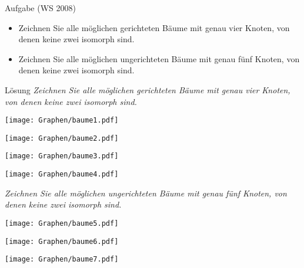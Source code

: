 \begin{frame}{Aufgabe (WS 2008) }
	\begin{itemize}	
		\item Zeichnen Sie alle möglichen gerichteten Bäume mit genau vier Knoten, von denen keine zwei isomorph sind.
		\item Zeichnen Sie alle möglichen ungerichteten Bäume mit genau fünf Knoten, von denen keine zwei isomorph sind.
	\end{itemize}
\end{frame}

\begin{frame}{Lösung}
	\textit{Zeichnen Sie alle möglichen gerichteten Bäume mit genau vier Knoten, von denen keine zwei isomorph sind.} \pause
	\begin{center}
		\begin{minipage}{0.3\linewidth}
			\vspace*{\fill}
			\centering
			\texttt{[image: Graphen/baume1.pdf]} 
			\vfill
		\end{minipage}
		\begin{minipage}{0.2\linewidth}
			\vspace*{\fill}
			\centering
			\texttt{[image: Graphen/baume2.pdf]} 
			\vfill
		\end{minipage}
		\begin{minipage}{0.2\linewidth}
			\vspace*{\fill}
			\centering
			\texttt{[image: Graphen/baume3.pdf]} 
			\vfill
		\end{minipage}
		\begin{minipage}{0.2\linewidth}
			\vspace*{\fill}
			\centering
			\texttt{[image: Graphen/baume4.pdf]} 
			\vfill
		\end{minipage}
	\end{center} \pause
	\textit{Zeichnen Sie alle möglichen ungerichteten Bäume mit genau fünf Knoten, von denen keine zwei isomorph sind.} \pause
	\begin{center}
		\begin{minipage}{0.2\linewidth}
			\vspace*{\fill}
			\centering
			\texttt{[image: Graphen/baume5.pdf]} 
			\vfill
		\end{minipage}
		\begin{minipage}{0.25\linewidth}
			\vspace*{\fill}
			\centering
			\texttt{[image: Graphen/baume6.pdf]} 
			\vfill
		\end{minipage}
		\begin{minipage}{0.35\linewidth}
			\vspace*{\fill}
			\centering
			\texttt{[image: Graphen/baume7.pdf]} 
			\vfill
		\end{minipage}
	\end{center}
\end{frame}


